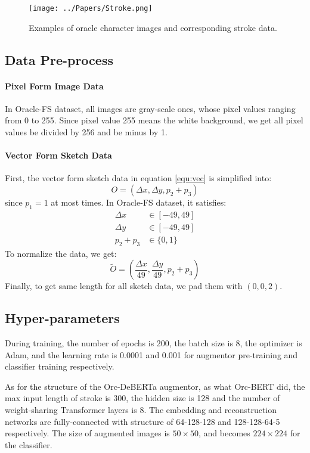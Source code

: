 \documentclass{article}
\begin{document}
\begin{figure}[h]
	\centering
	\texttt{[image: ../Papers/Stroke.png]}
	\caption{Examples of oracle character images and corresponding stroke data.}
	\label{fig:stroke}
\end{figure}

\subsection{Data Pre-process}

\paragraph{Pixel Form Image Data}
In Oracle-FS dataset, all images are gray-scale ones, whose pixel values ranging from 0 to 255. Since pixel value 255 means the white background, we get all pixel values be divided by 256 and be minus by 1.

\paragraph{Vector Form Sketch Data}
First, the vector form sketch data in equation \ref{equ:vec} is simplified into:
\begin{equation*}
	O = (\Delta x, \Delta y, p_2 + p_3) 
\end{equation*} 
since $ p_1 = 1 $ at most times.
In Oracle-FS dataset, it satisfies:
\begin{align*}
	\Delta x &\in [-49, 49] \\
	\Delta y &\in [-49, 49] \\
	p_2 + p_3 &\in \{0, 1\}
\end{align*}
To normalize the data, we get:
\begin{equation*}
	\tilde{O} = 
	(\frac{\Delta x}{49}, \frac{\Delta y}{49},	p_2 + p_3) 
\end{equation*} 
Finally, to get same length for all sketch data, we pad them with $(0, 0, 2)$.

\subsection{Hyper-parameters}

During training, the number of epochs is 200, the batch size is 8, the optimizer is Adam, and the learning rate is 0.0001 and 0.001 for augmentor pre-training and classifier training respectively.

As for the structure of the Orc-DeBERTa augmentor, as what Orc-BERT did, the max input length of stroke is 300, the hidden size is 128 and the number of weight-sharing Transformer layers is 8. The embedding and reconstruction networks are fully-connected with structure of 64-128-128 and 128-128-64-5 respectively. The size of augmented images is $ 50 \times 50 $, and becomes $ 224 \times 224 $ for the classifier.
\end{document}
